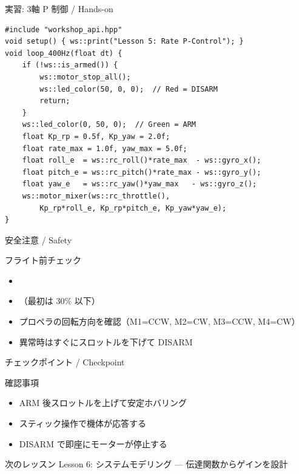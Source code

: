 \documentclass[aspectratio=169, 14pt]{beamer}
\begin{document}
\begin{frame}[fragile]{実習: 3軸 P 制御 / Hands-on}
  \begin{lstlisting}[style=sfcpp, title={user\_code.cpp}]
#include "workshop_api.hpp"
void setup() { ws::print("Lesson 5: Rate P-Control"); }
void loop_400Hz(float dt) {
    if (!ws::is_armed()) {
        ws::motor_stop_all();
        ws::led_color(50, 0, 0);  // Red = DISARM
        return;
    }
    ws::led_color(0, 50, 0);  // Green = ARM
    float Kp_rp = 0.5f, Kp_yaw = 2.0f;
    float rate_max = 1.0f, yaw_max = 5.0f;
    float roll_e  = ws::rc_roll()*rate_max  - ws::gyro_x();
    float pitch_e = ws::rc_pitch()*rate_max - ws::gyro_y();
    float yaw_e   = ws::rc_yaw()*yaw_max   - ws::gyro_z();
    ws::motor_mixer(ws::rc_throttle(),
        Kp_rp*roll_e, Kp_rp*pitch_e, Kp_yaw*yaw_e);
}
  \end{lstlisting}
\end{frame}

\begin{frame}{安全注意 / Safety}
  \begin{alertblock}{フライト前チェック}
    \begin{itemize}
      \item[$\square$] 
      \item[$\square$] （最初は 30\% 以下）
      \item[$\square$] プロペラの回転方向を確認（M1=CCW, M2=CW, M3=CCW, M4=CW）
      \item[$\square$] 異常時はすぐにスロットルを下げて DISARM
    \end{itemize}
  \end{alertblock}
\end{frame}

\begin{frame}{チェックポイント / Checkpoint}
  \begin{alertblock}{確認事項}
    \begin{itemize}
      \item[$\square$] ARM 後スロットルを上げて安定ホバリング
      \item[$\square$] スティック操作で機体が応答する
      \item[$\square$] DISARM で即座にモーターが停止する
    \end{itemize}
  \end{alertblock}

  \vspace{1em}

  \begin{block}{次のレッスン}
    Lesson 6: システムモデリング --- 伝達関数からゲインを設計
  \end{block}
\end{frame}
\end{document}
